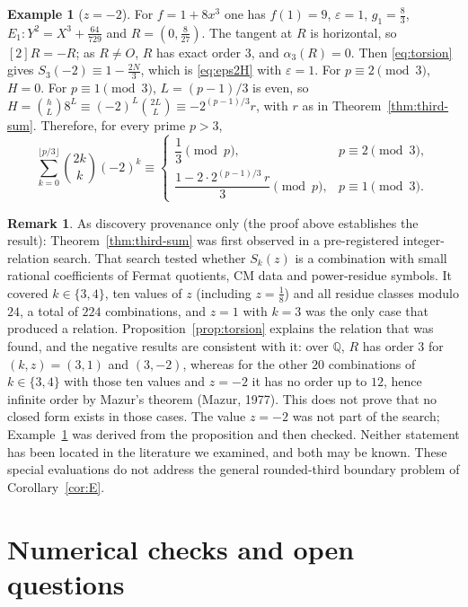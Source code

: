 \documentclass[11pt,a4paper]{article}
\numberwithin{equation}{section}
\theoremstyle{plain}
\theoremstyle{definition}
\newtheorem{example}[theorem]{Example}
\newtheorem{remark}[theorem]{Remark}
\newcommand{\eps}{\varepsilon}
\begin{document}
\begin{example}[$z=-2$]\label{ex:z-2}
For $f=1+8x^3$ one has $f(1)=9$, $\eps=1$, $g_1=\tfrac83$, $E_1:Y^2=X^3+\tfrac{64}{729}$ and $R=(0,\tfrac8{27})$. The tangent at $R$ is horizontal, so $[2]R=-R$; as $R\neq O$, $R$ has exact order $3$, and $\alpha_3(R)=0$. Then \eqref{eq:torsion} gives $S_3(-2)\equiv1-\tfrac{2N}{3}$, which is \eqref{eq:eps2H} with $\eps=1$. For $p\equiv2\pmod3$, $H=0$. For $p\equiv1\pmod3$, $L=(p-1)/3$ is even, so $H=\binom{h}{L}8^L\equiv(-2)^L\binom{2L}{L}\equiv-2^{(p-1)/3}r$, with $r$ as in Theorem~\ref{thm:third-sum}. Therefore, for every prime $p>3$,
\[
\sum_{k=0}^{\lfloor p/3\rfloor}\binom{2k}{k}(-2)^k\equiv
\begin{cases}
\dfrac13\pmod p, & p\equiv2\pmod3,\\[2mm]
\dfrac{1-2\cdot2^{(p-1)/3}\,r}{3}\pmod p, & p\equiv1\pmod3.
\end{cases}
\]
\end{example}

\begin{remark}\label{rem:torsion-search}
As discovery provenance only (the proof above establishes the result): Theorem~\ref{thm:third-sum} was first observed in a pre-registered integer-relation search. That search tested whether $S_k(z)$ is a combination with small rational coefficients of Fermat quotients, CM data and power-residue symbols. It covered $k\in\{3,4\}$, ten values of $z$ (including $z=\tfrac18$) and all residue classes modulo $24$, a total of $224$ combinations, and $z=1$ with $k=3$ was the only case that produced a relation. Proposition~\ref{prop:torsion} explains the relation that was found, and the negative results are consistent with it: over $\mathbb Q$, $R$ has order $3$ for $(k,z)=(3,1)$ and $(3,-2)$, whereas for the other $20$ combinations of $k\in\{3,4\}$ with those ten values and $z=-2$ it has no order up to $12$, hence infinite order by Mazur's theorem (Mazur, 1977). This does not prove that no closed form exists in those cases. The value $z=-2$ was not part of the search; Example~\ref{ex:z-2} was derived from the proposition and then checked. Neither statement has been located in the literature we examined, and both may be known. These special evaluations do not address the general rounded-third boundary problem of Corollary~\ref{cor:E}.
\end{remark}

\section{Numerical checks and open questions}\label{sec:checks}
\end{document}
